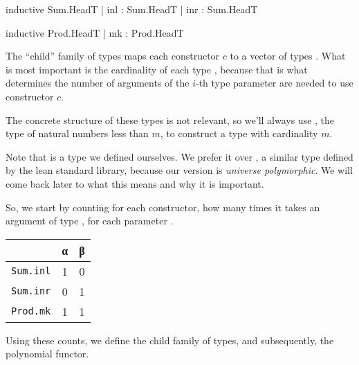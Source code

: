 \documentclass[titlepage]{report}
\newenvironment{remark}[1][Remark:]{\begin{trivlist}                         
    \item[\hskip \labelsep {\bfseries #1}]}{\end{trivlist}}
\begin{document}
\begin{center}
    \begin{minipage}[t]{0.45\linewidth}
        \begin{leancode}
    inductive Sum.HeadT
      | inl : Sum.HeadT
      | inr : Sum.HeadT
        \end{leancode}
    \end{minipage}
    \begin{minipage}[t]{0.45\linewidth}
        \begin{leancode}    
    inductive Prod.HeadT
      | mk : Prod.HeadT
        \end{leancode}
    \end{minipage}
\end{center}

The ``child'' family of types maps each constructor $c$ to a vector of types .
What is most important is the cardinality of each type , 
because that is what determines the number of arguments of the $i$-th type parameter are needed
to use constructor $c$. 

The concrete structure of these types is not relevant, so we'll always use , the type
of natural numbers less than $m$, to construct a type with cardinality $m$.

\begin{remark}
    Note that  is a type we defined ourselves. We prefer it over , a similar
    type defined by the lean standard library, because our version is \emph{universe polymorphic}.
    We will come back later to what this means and why it is important.
\end{remark}

So, we start by counting for each constructor, how many times it takes an argument of type ,
for each parameter .
\begin{center}
\begin{tabular}{l|c|c}
    & α & β \\ \hline
    \texttt{Sum.inl}  & 1 & 0 \\
    \texttt{Sum.inr}  & 0 & 1 \\
    \texttt{Prod.mk}  & 1 & 1 \\    
\end{tabular}    
\end{center}

Using these counts, we define the child family of types, and subsequently, the polynomial functor.

\begin{center}
\end{center}
\end{document}
